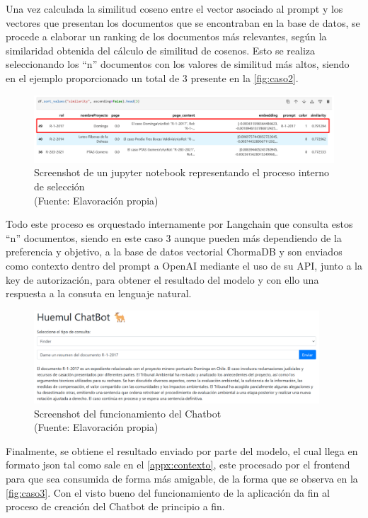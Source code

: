 Una vez calculada la similitud coseno entre el vector asociado al prompt y los vectores que presentan los documentos que se encontraban en la 
base de datos, se procede a elaborar un ranking de los documentos más relevantes, según la similaridad obtenida del cálculo de similitud de cosenos. 
Esto se realiza seleccionando los ``n'' documentos con los valores de similitud más altos, siendo en el ejemplo proporcionado un total de 3 
presente en la \autoref{fig:caso2}.

\begin{figure}[ht!]
    \centering
    \includegraphics[width=1\textwidth]{figures/embedding2.png}
    \caption[Screenshot de un jupyter notebook representando el proceso interno de selección]{Screenshot de un jupyter notebook representando el proceso interno de selección\\
    {\scriptsize (Fuente: Elavoración propia)}}
    \label{fig:caso2}
\end{figure}

\newpage

Todo este proceso es orquestado internamente por Langchain que consulta estos ``n'' documentos, siendo en este caso 3 aunque pueden 
más dependiendo de la preferencia y objetivo, a la base de datos vectorial
ChormaDB y son enviados como contexto dentro del prompt a OpenAI mediante el uso de su API, junto a la key de autorización, 
para obtener el resultado del modelo y con ello una respuesta a la consuta en lenguaje natural.



\begin{figure}[ht!]
    \centering
    \includegraphics[width=0.95\textwidth]{figures/website2.png}
    \caption[Screenshot del funcionamiento del Chatbot]{Screenshot del funcionamiento del Chatbot\\
    {\scriptsize (Fuente: Elavoración propia)}}
    \label{fig:caso3}
\end{figure}

Finalmente, se obtiene el resultado enviado por parte del modelo, el cual llega en formato json tal como sale en el \autoref{appx:contexto},
este procesado por el frontend para que sea consumida de forma más amigable, de la forma que se observa en la \autoref{fig:caso3}.
Con el visto bueno del funcionamiento de la aplicación da fin al proceso de creación del Chatbot de principio a fin.
